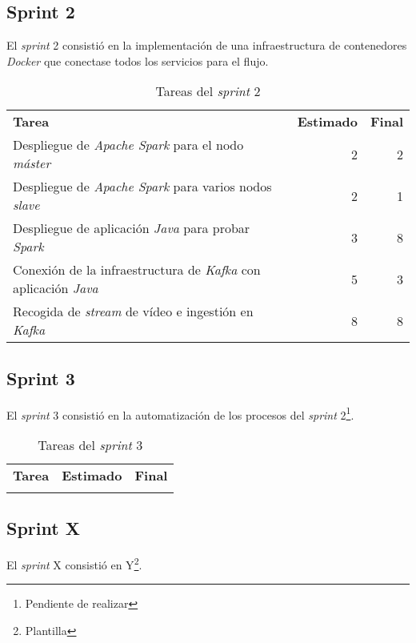 \subsection{Sprint 2}

El \textit{sprint} 2 consistió en la implementación de una infraestructura de contenedores \textit{Docker} que conectase todos los servicios para el flujo. 

\begin{table}[H]
	\begin{tabularx}{\linewidth}{X r r}
		\toprule \textbf{Tarea} & \textbf{Estimado} & \textbf{Final}\\
		\otoprule
		Despliegue de \textit{Apache Spark} para el nodo \textit{máster} & 2 & 2\\
		Despliegue de \textit{Apache Spark} para varios nodos \textit{slave} & 2 & 1\\
		Despliegue de aplicación \textit{Java} para probar \textit{Spark} & 3 & 8 \\
		Conexión de la infraestructura de \textit{Kafka} con aplicación \textit{Java} & 5 & 3 \\
		Recogida de \textit{stream} de vídeo e ingestión en \textit{Kafka} & 8 & 8\\
		\bottomrule
	\end{tabularx}
	\caption{Tareas del \textit{sprint} 2}
	\label{tab:sprint2}
\end{table}

\subsection{Sprint 3}

El \textit{sprint} 3 consistió en la automatización de los procesos del \textit{sprint} 2\footnote{Pendiente de realizar}. 

\begin{table}[H]
	\begin{tabularx}{\linewidth}{X r r}
		\toprule \textbf{Tarea} & \textbf{Estimado} & \textbf{Final}\\
		\otoprule
		\bottomrule
	\end{tabularx}
	\caption{Tareas del \textit{sprint} 3}
	\label{tab:sprint3}
\end{table}


\subsection{Sprint X}

El \textit{sprint} X consistió en Y\footnote{Plantilla}. 

